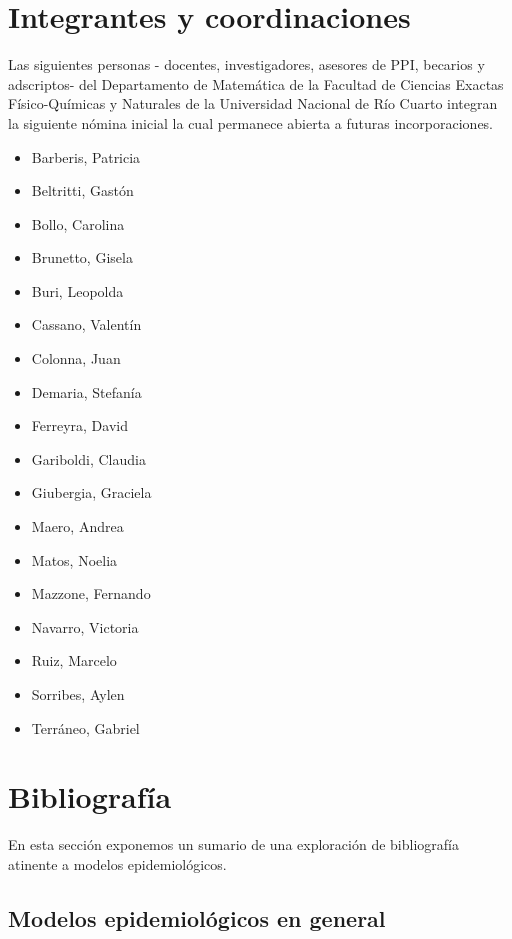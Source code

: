 \documentclass{article}
\begin{document}
\section{Integrantes y coordinaciones}\label{integrantes}

Las siguientes personas - docentes, investigadores, asesores de PPI, becarios y adscriptos-  del Departamento de Matemática de la Facultad de Ciencias Exactas Físico-Químicas y Naturales de la Universidad Nacional de Río Cuarto integran la siguiente nómina inicial la cual permanece abierta a futuras incorporaciones.

\begin{itemize}
	\item  Barberis, Patricia
	\item  Beltritti, Gastón
	\item  Bollo, Carolina
	\item  Brunetto, Gisela
	\item  Buri, Leopolda
	\item  Cassano, Valentín
	\item  Colonna, Juan
	\item  Demaria, Stefanía
	\item  Ferreyra, David
	\item  Gariboldi, Claudia
	\item  Giubergia, Graciela
	\item  Maero, Andrea
	\item  Matos, Noelia
	\item  Mazzone, Fernando
	\item Navarro, Victoria
	\item Ruiz, Marcelo
	\item  Sorribes, Aylen
	\item Terráneo, Gabriel
	\end{itemize}



\section{Bibliografía}

En esta sección exponemos un sumario de una exploración  de bibliografía atinente a modelos epidemiológicos.

\subsection{Modelos epidemiológicos en general}
\end{document}
